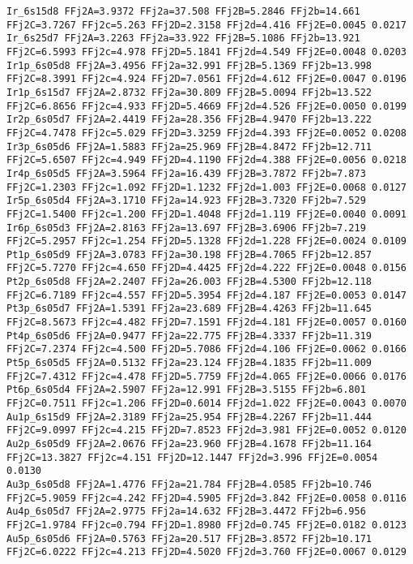 {\begin{verbatim}
Ir_6s15d8 FFj2A=3.9372 FFj2a=37.508 FFj2B=5.2846 FFj2b=14.661 FFj2C=3.7267 FFj2c=5.263 FFj2D=2.3158 FFj2d=4.416 FFj2E=0.0045 0.0217 
Ir_6s25d7 FFj2A=3.2263 FFj2a=33.922 FFj2B=5.1086 FFj2b=13.921 FFj2C=6.5993 FFj2c=4.978 FFj2D=5.1841 FFj2d=4.549 FFj2E=0.0048 0.0203 
Ir1p_6s05d8 FFj2A=3.4956 FFj2a=32.991 FFj2B=5.1369 FFj2b=13.998 FFj2C=8.3991 FFj2c=4.924 FFj2D=7.0561 FFj2d=4.612 FFj2E=0.0047 0.0196 
Ir1p_6s15d7 FFj2A=2.8732 FFj2a=30.809 FFj2B=5.0094 FFj2b=13.522 FFj2C=6.8656 FFj2c=4.933 FFj2D=5.4669 FFj2d=4.526 FFj2E=0.0050 0.0199 
Ir2p_6s05d7 FFj2A=2.4419 FFj2a=28.356 FFj2B=4.9470 FFj2b=13.222 FFj2C=4.7478 FFj2c=5.029 FFj2D=3.3259 FFj2d=4.393 FFj2E=0.0052 0.0208 
Ir3p_6s05d6 FFj2A=1.5883 FFj2a=25.969 FFj2B=4.8472 FFj2b=12.711 FFj2C=5.6507 FFj2c=4.949 FFj2D=4.1190 FFj2d=4.388 FFj2E=0.0056 0.0218 
Ir4p_6s05d5 FFj2A=3.5964 FFj2a=16.439 FFj2B=3.7872 FFj2b=7.873 FFj2C=1.2303 FFj2c=1.092 FFj2D=1.1232 FFj2d=1.003 FFj2E=0.0068 0.0127 
Ir5p_6s05d4 FFj2A=3.1710 FFj2a=14.923 FFj2B=3.7320 FFj2b=7.529 FFj2C=1.5400 FFj2c=1.200 FFj2D=1.4048 FFj2d=1.119 FFj2E=0.0040 0.0091 
Ir6p_6s05d3 FFj2A=2.8163 FFj2a=13.697 FFj2B=3.6906 FFj2b=7.219 FFj2C=5.2957 FFj2c=1.254 FFj2D=5.1328 FFj2d=1.228 FFj2E=0.0024 0.0109 
Pt1p_6s05d9 FFj2A=3.0783 FFj2a=30.198 FFj2B=4.7065 FFj2b=12.857 FFj2C=5.7270 FFj2c=4.650 FFj2D=4.4425 FFj2d=4.222 FFj2E=0.0048 0.0156 
Pt2p_6s05d8 FFj2A=2.2407 FFj2a=26.003 FFj2B=4.5300 FFj2b=12.118 FFj2C=6.7189 FFj2c=4.557 FFj2D=5.3954 FFj2d=4.187 FFj2E=0.0053 0.0147 
Pt3p_6s05d7 FFj2A=1.5391 FFj2a=23.689 FFj2B=4.4263 FFj2b=11.645 FFj2C=8.5673 FFj2c=4.482 FFj2D=7.1591 FFj2d=4.181 FFj2E=0.0057 0.0160 
Pt4p_6s05d6 FFj2A=0.9477 FFj2a=22.775 FFj2B=4.3337 FFj2b=11.319 FFj2C=7.2374 FFj2c=4.500 FFj2D=5.7086 FFj2d=4.106 FFj2E=0.0062 0.0166 
Pt5p_6s05d5 FFj2A=0.5132 FFj2a=23.124 FFj2B=4.1835 FFj2b=11.009 FFj2C=7.4312 FFj2c=4.478 FFj2D=5.7759 FFj2d=4.065 FFj2E=0.0066 0.0176 
Pt6p_6s05d4 FFj2A=2.5907 FFj2a=12.991 FFj2B=3.5155 FFj2b=6.801 FFj2C=0.7511 FFj2c=1.206 FFj2D=0.6014 FFj2d=1.022 FFj2E=0.0043 0.0070 
Au1p_6s15d9 FFj2A=2.3189 FFj2a=25.954 FFj2B=4.2267 FFj2b=11.444 FFj2C=9.0997 FFj2c=4.215 FFj2D=7.8523 FFj2d=3.981 FFj2E=0.0052 0.0120 
Au2p_6s05d9 FFj2A=2.0676 FFj2a=23.960 FFj2B=4.1678 FFj2b=11.164 FFj2C=13.3827 FFj2c=4.151 FFj2D=12.1447 FFj2d=3.996 FFj2E=0.0054 0.0130 
Au3p_6s05d8 FFj2A=1.4776 FFj2a=21.784 FFj2B=4.0585 FFj2b=10.746 FFj2C=5.9059 FFj2c=4.242 FFj2D=4.5905 FFj2d=3.842 FFj2E=0.0058 0.0116 
Au4p_6s05d7 FFj2A=2.9775 FFj2a=14.632 FFj2B=3.4472 FFj2b=6.956 FFj2C=1.9784 FFj2c=0.794 FFj2D=1.8980 FFj2d=0.745 FFj2E=0.0182 0.0123 
Au5p_6s05d6 FFj2A=0.5763 FFj2a=20.517 FFj2B=3.8572 FFj2b=10.171 FFj2C=6.0222 FFj2c=4.213 FFj2D=4.5020 FFj2d=3.760 FFj2E=0.0067 0.0129 

\end{verbatim}}
